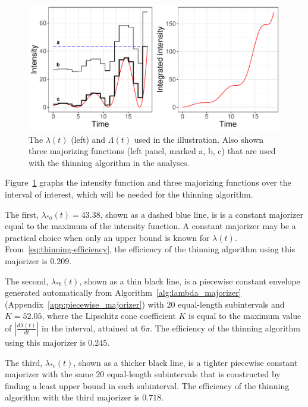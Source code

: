 \documentclass[article]{jss}\usepackage[]{graphicx}\usepackage[]{xcolor}
\makeatletter
\def\maxwidth{ %
  \ifdim\Gin@nat@width>\linewidth
    \linewidth
  \else
    \Gin@nat@width
  \fi
}
\newenvironment{knitrout}{}{} %
\newcommand{\der}[2]{\frac{d {#1}} {d{#2}}}
\makeatother
\begin{document}
\begin{knitrout}
\color{fgcolor}\begin{figure}
\includegraphics[width=\maxwidth]{figure/example-function-plot-1} \caption[The $\lambda(t)$ (left) and $\Lambda(t)$ used in the illustration]{The $\lambda(t)$ (left) and $\Lambda(t)$ used in the illustration. Also shown three majorizing functions (left panel, marked a, b, c) that are used with the thinning algorithm in the analyses.}\label{fig:example-function-plot}
\end{figure}

\end{knitrout}

Figure~\ref{fig:example-function-plot} graphs the intensity function and three majorizing functions over the interval of interest, which will be needed for the thinning algorithm.

The first, $\lambda_{*a}(t) = 43.38$, shown as a dashed blue line, is is a constant majorizer equal to the maximum of the intensity function. A constant majorizer may be a practical choice when only an upper bound is known for $\lambda(t)$.
From~\eqref{eq:thinning-efficiency}, the efficiency of the thinning algorithm using this majorizer is
$0.209$.

The second, $\lambda_{*b}(t)$, shown as a thin black line, is a piecewise constant envelope generated automatically from Algorithm~\ref{alg:lambda_majorizer} (Appendix~\ref{app:piecewise_majorizer}) with $20$ equal-length subintervals and ${K = 52.05}$, where the Lipschitz cone coefficient $K$ is equal to the maximum value of $|\der{\lambda(t)}{t}|$ in the interval, attained at $6\pi$.
The efficiency of the thinning algorithm using this majorizer is
$0.245$.

The third, $\lambda_{*c}(t)$, shown as a thicker black line, is a tighter piecewise constant majorizer with the same $20$ equal-length subintervals that is constructed by finding a least upper bound in each subinterval. The efficiency of the thinning algorithm with the third
majorizer is
$0.718$.
\end{document}
